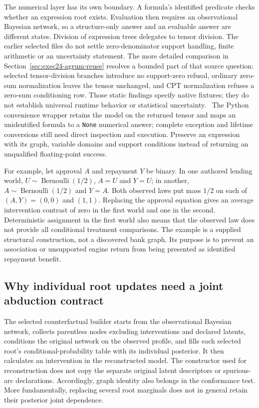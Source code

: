 The numerical layer has its own boundary. A formula's identified predicate
checks whether an expression root exists. Evaluation then requires an
observational Bayesian network, so a structure-only answer and an evaluable
answer are different states. Division of expression trees delegates to tensor
division. The earlier selected files do not settle zero-denominator support
handling, finite arithmetic or an uncertainty statement. The more detailed
comparison in Section~\ref{sec:exec24-agrum-reuse} resolves a bounded part of
that source question: selected tensor-division branches introduce no support-zero
refusal, ordinary zero-sum normalization leaves the tensor unchanged, and CPT
normalization refuses a zero-sum conditioning row. Those static findings specify
native fixtures; they do not establish universal runtime behavior or statistical
uncertainty.~\citep{exec24_agrum_source,exec24_agrum_choice}
The Python convenience wrapper
retains the model on the returned tensor and maps an unidentified formula to a
\texttt{None} numerical answer; complete exception and lifetime conversions
still need direct inspection and execution. Preserve an expression with its
graph, variable domains and support conditions instead of returning an
unqualified floating-point success.
\citep{exec19_cxx_identification_source}

For example, let approval $A$ and repayment $Y$ be binary. In one authored
lending world, $U\sim\operatorname{Bernoulli}(1/2)$, $A=U$ and $Y=U$;
in another, $A\sim\operatorname{Bernoulli}(1/2)$ and $Y=A$. Both observed laws
put mass $1/2$ on each of $(A,Y)=(0,0)$ and $(1,1)$. Replacing the approval
equation gives an average intervention contrast of zero in the first world
and one in the second. Deterministic assignment in the first world also means
that the observed law does not provide all conditional treatment comparisons.
The example is a supplied structural construction, not a discovered bank graph.
Its purpose is to prevent an association or unsupported engine return from
being presented as identified repayment benefit.
\citep{exec19_cxx_identification_reference}

\subsection{Why individual root updates need a joint abduction contract}
\label{exec19:cxxid-abduction}
The selected counterfactual builder starts from the observational Bayesian
network, collects parentless nodes excluding interventions and declared latents,
conditions the original network on the observed profile, and fills each selected
root's conditional-probability table with its individual posterior. It then
calculates an intervention in the reconstructed model. The constructor used
for reconstruction does not copy the separate original latent descriptors or
spurious-arc declarations. Accordingly, graph identity also belongs in the
conformance test. More fundamentally, replacing several root marginals does
not in general retain their posterior joint dependence.
\citep{exec19_cxx_identification_source}

